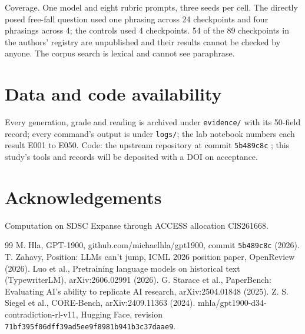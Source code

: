 \documentclass[reprint,prx,amsmath,amssymb,aps,superscriptaddress]{revtex4-2}
\begin{document}
Coverage. One model and eight rubric prompts, three seeds per cell. The directly posed free-fall question used one phrasing across 24 checkpoints and four phrasings across 4; the controls used 4 checkpoints. 54 of the 89 checkpoints in the authors' registry are unpublished and their results cannot be checked by anyone. The corpus search is lexical and cannot see paraphrase.

\section{Data and code availability}

Every generation, grade and reading is archived under \texttt{evidence/} with its 50-field record; every command's output is under \texttt{logs/}; the lab notebook numbers each result E001 to E050. Code: the upstream repository at commit \texttt{5b489c8c} \cite{ref1}; this study's tools and records will be deposited with a DOI on acceptance.

\section{Acknowledgements}

Computation on SDSC Expanse through ACCESS allocation CIS261668.

\begin{thebibliography}{99}
 M. Hla, GPT-1900, github.com/michaelhla/gpt1900, commit \texttt{5b489c8c} (2026).
 T. Zahavy, Position: LLMs can't jump, ICML 2026 position paper, OpenReview (2026).
 Luo et al., Pretraining language models on historical text (TypewriterLM), arXiv:2606.02991 (2026).
 G. Starace et al., PaperBench: Evaluating AI's ability to replicate AI research, arXiv:2504.01848 (2025).
 Z. S. Siegel et al., CORE-Bench, arXiv:2409.11363 (2024).
 mhla/gpt1900-d34-contradiction-rl-v11, Hugging Face, revision \texttt{71bf395f06dff39ad5ee9f8981b941b3c37daae9}.
\end{thebibliography}
\end{document}

